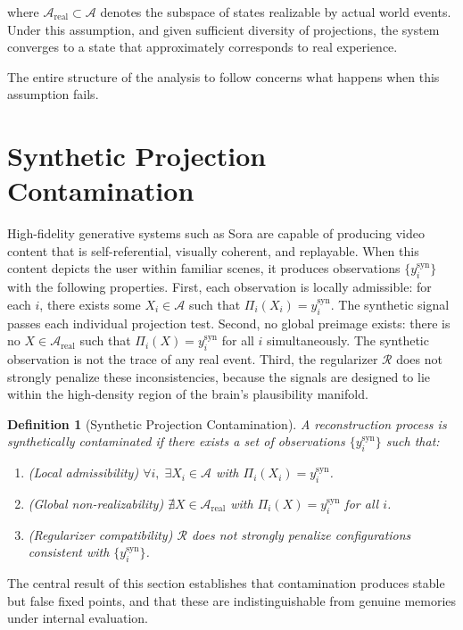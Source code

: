 \documentclass[12pt, letterpaper]{article}
\theoremstyle{flyxion}
\newtheorem{definition}{Definition}
\begin{document}
where $\mathcal{A}_\mathrm{real} \subset \mathcal{A}$ denotes the subspace of states realizable by actual world events. Under this assumption, and given sufficient diversity of projections, the system converges to a state that approximately corresponds to real experience.

The entire structure of the analysis to follow concerns what happens when this assumption fails.

\section{Synthetic Projection Contamination}

High-fidelity generative systems such as Sora are capable of producing video content that is self-referential, visually coherent, and replayable. When this content depicts the user within familiar scenes, it produces observations $\{y_i^\mathrm{syn}\}$ with the following properties. First, each observation is locally admissible: for each $i$, there exists some $X_i \in \mathcal{A}$ such that $\Pi_i(X_i) = y_i^\mathrm{syn}$. The synthetic signal passes each individual projection test. Second, no global preimage exists: there is no $X \in \mathcal{A}_\mathrm{real}$ such that $\Pi_i(X) = y_i^\mathrm{syn}$ for all $i$ simultaneously. The synthetic observation is not the trace of any real event. Third, the regularizer $\mathcal{R}$ does not strongly penalize these inconsistencies, because the signals are designed to lie within the high-density region of the brain's plausibility manifold.

\begin{definition}[Synthetic Projection Contamination]
A reconstruction process is synthetically contaminated if there exists a set of observations $\{y_i^\mathrm{syn}\}$ such that:
\begin{enumerate}
\item (Local admissibility) $\forall i,\; \exists X_i \in \mathcal{A}$ with $\Pi_i(X_i) = y_i^\mathrm{syn}$.
\item (Global non-realizability) $\nexists X \in \mathcal{A}_\mathrm{real}$ with $\Pi_i(X) = y_i^\mathrm{syn}$ for all $i$.
\item (Regularizer compatibility) $\mathcal{R}$ does not strongly penalize configurations consistent with $\{y_i^\mathrm{syn}\}$.
\end{enumerate}
\end{definition}

The central result of this section establishes that contamination produces stable but false fixed points, and that these are indistinguishable from genuine memories under internal evaluation.
\end{document}
